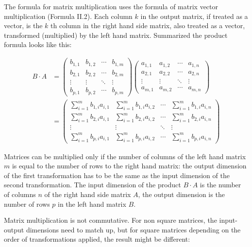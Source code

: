 The formula for matrix multiplication uses the formula of matrix vector multiplication (Formula II.2). Each column \(k\) in the output matrix, if treated as a vector, is the \(k\) th column in the right hand side matrix, also treated as a vector, transformed  (multiplied) by the left hand matrix. Summarized the product formula looks like this:

\[\begin{aligned}B \cdot A &= \begin{pmatrix}
  b_{1,1} & b_{1,2} & \cdots & b_{1,m} \\
  b_{2,1} & b_{2,2} & \cdots & b_{2,m} \\
  \vdots  & \vdots  & \ddots & \vdots  \\
  b_{p,1} & b_{p,2} & \cdots & b_{p,m}
 \end{pmatrix}\begin{pmatrix}
  a_{1,1} & a_{1,2} & \cdots & a_{1,n} \\
  a_{2,1} & a_{2,2} & \cdots & a_{2,n} \\
  \vdots  & \vdots  & \ddots & \vdots  \\
  a_{m,1} & a_{m,2} & \cdots & a_{m,n}
 \end{pmatrix}\\ &= \begin{pmatrix}
  \sum_{i=1}^m b_{1,i}a_{i,1} & \sum_{i=1}^m b_{1,i}a_{i,2} & \cdots & \sum_{i=1}^m b_{1,i}a_{i,n} \\
  \sum_{i=1}^m b_{2,i}a_{i,1} & \sum_{i=1}^m b_{2,i}a_{i,2} & \cdots & \sum_{i=1}^m b_{2,i}a_{i,n} \\
  \vdots  & \vdots  & \ddots & \vdots  \\
  \sum_{i=1}^m b_{p,i}a_{i,1} & \sum_{i=1}^m b_{p,i}a_{i,2} & \cdots & \sum_{i=1}^m b_{p,i}a_{i,n}
 \end{pmatrix}\end{aligned}\]

Matrices can be multiplied only if the number of columns of the left hand matrix \(m\) is equal to the number of rows to the right hand matrix: the output dimension of the first transformation has to be the same as the input dimension of the second transformation. The input dimension of the product \(B \cdot A\) is the number of columns \(n\) of the right hand side matrix \(A\), the output dimension is the number of rows \(p\) in the left hand matrix \(B\).

Matrix multiplication is not commutative. For non square matrices, the input-output dimensions need to match up, but for square matrices depending on the order of transformations applied, the result might be different:

